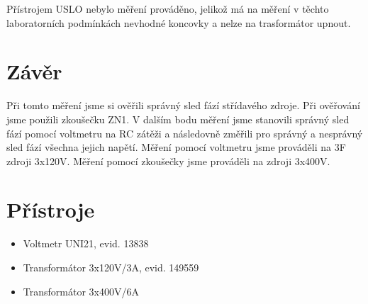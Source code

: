 \documentclass[12pt]{article} %
\begin{document}
Přístrojem USLO nebylo měření prováděno, jelikož má na měření v těchto laboratorních podmínkách nevhodné koncovky a nelze na trasformátor upnout.

\section{Závěr}
Při tomto měření jsme si ověřili správný sled fází střídavého zdroje. Při ověřování jsme použili zkoušečku ZN1. V dalším bodu měření jsme stanovili správný sled fází pomocí voltmetru na RC zátěži a následovně  změřili pro správný a nesprávný sled fází všechna jejich napětí. Měření pomocí voltmetru jsme prováděli na 3F zdroji 3x120V. Měření pomocí zkoušečky jsme prováděli na zdroji 3x400V.

\section{Přístroje}
\begin{itemize}
\item Voltmetr UNI21, evid. 13838
\item Transformátor 3x120V/3A, evid. 149559
\item Transformátor 3x400V/6A
\end{itemize}
\end{document}
